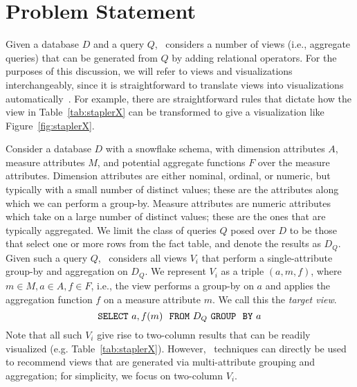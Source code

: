 

\section{Problem Statement}
\label{sec:problem_statement}

Given a database $D$ and a query $Q$, \VizRecDB\ considers a number of views (i.e., aggregate queries) that
can be generated from $Q$ by adding relational operators.
For the purposes of this discussion, we will refer to views and visualizations
interchangeably, since it is straightforward to translate views into
visualizations automatically~\cite{DBLP:journals/cacm/StolteTH08}. 
For example, there are straightforward rules that
dictate how the view in Table~\ref{tab:staplerX} can be transformed to give a
visualization like Figure~\ref{fig:staplerX}.





Consider a database $D$ with a snowflake schema,
with dimension attributes $A$, measure attributes $M$, and potential
aggregate functions $F$ over the measure attributes.
Dimension attributes are either nominal, ordinal, or numeric,
but typically with a small number of distinct values;
these are the attributes along which we can perform a group-by.
Measure attributes are numeric attributes which take on a large number 
of distinct values; 
these are the ones that are typically aggregated.
We limit the class of queries $Q$ posed over $D$ to be
those that select one or more rows from the fact table, and denote the results
as $D_Q$. 
Given such a query $Q$, \VizRecDB\ considers all views $V_i$ that perform a
single-attribute group-by and aggregation on $D_Q$. 
We represent $V_i$ as a
triple $(a, m, f)$, where $m \in M, a \in A, f \in F$, i.e., the view
performs a group-by on $a$ and applies the aggregation function $f$ on a measure
attribute $m$. We call this the {\em target view}.
$${\tt SELECT \ } a, f(m) \ \ {\tt FROM} \  D_Q\  {\tt GROUP \ \ BY} \ a$$ 
Note that all such $V_i$ give rise to two-column results that can 
be readily visualized (e.g.
Table~\ref{tab:staplerX}). 
However, \VizRecDB\ techniques can directly be used to recommend views that are
generated via multi-attribute grouping and aggregation; 
for simplicity, we focus on two-column $V_i$. 


